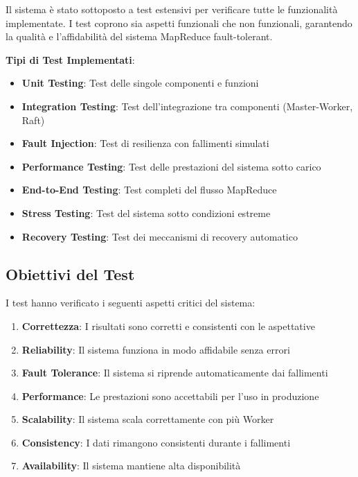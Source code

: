 \documentclass[12pt,a4paper]{article}
\begin{document}
Il sistema è stato sottoposto a test estensivi per verificare tutte le funzionalità implementate. I test coprono sia aspetti funzionali che non funzionali, garantendo la qualità e l'affidabilità del sistema MapReduce fault-tolerant.

\textbf{Tipi di Test Implementati}:

\begin{itemize}
\item \textbf{Unit Testing}: Test delle singole componenti e funzioni
\item \textbf{Integration Testing}: Test dell'integrazione tra componenti (Master-Worker, Raft)
\item \textbf{Fault Injection}: Test di resilienza con fallimenti simulati
\item \textbf{Performance Testing}: Test delle prestazioni del sistema sotto carico
\item \textbf{End-to-End Testing}: Test completi del flusso MapReduce
\item \textbf{Stress Testing}: Test del sistema sotto condizioni estreme
\item \textbf{Recovery Testing}: Test dei meccanismi di recovery automatico
\end{itemize}

\subsection{Obiettivi del Test}

I test hanno verificato i seguenti aspetti critici del sistema:

\begin{enumerate}
\item \textbf{Correttezza}: I risultati sono corretti e consistenti con le aspettative
\item \textbf{Reliability}: Il sistema funziona in modo affidabile senza errori
\item \textbf{Fault Tolerance}: Il sistema si riprende automaticamente dai fallimenti
\item \textbf{Performance}: Le prestazioni sono accettabili per l'uso in produzione
\item \textbf{Scalability}: Il sistema scala correttamente con più Worker
\item \textbf{Consistency}: I dati rimangono consistenti durante i fallimenti
\item \textbf{Availability}: Il sistema mantiene alta disponibilità
\end{enumerate}
\end{document}
